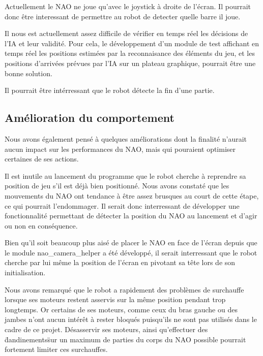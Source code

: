     \par Actuellement le NAO ne joue qu'avec le joystick à droite de l'écran.
    Il pourrait donc être interessant de permettre au robot de detecter quelle barre il joue. \\

    \par Il nous est actuellement assez difficile de vérifier en temps réel les décisions de l'IA et leur validité.
    Pour cela, le développement d'un module de test affichant en temps réel les positions estimées par la reconnaisance des éléments du jeu, et les positions d'arrivées prévues par l'IA sur un plateau graphique, pourrait être une bonne solution.

    \par Il pourrait être intérressant que le robot détecte la fin d'une partie.


  \subsection{Amélioration du comportement}
  \label{sub:Amélioration du comportement}
    \par Nous avons également pensé à quelques améliorations dont la finalité n'aurait aucun impact sur les performances du NAO, mais qui pouraient optimiser certaines de ses actions.\\

    \par Il est inutile au lancement du programme que le robot cherche à reprendre sa position de jeu s'il est déjà bien positionné.
    Nous avons constaté que les mouvements du NAO ont tendance à être assez brusques au court de cette étape, ce qui pourrait l'endommager.
    Il serait donc interressant de développer une fonctionnalité permettant de détecter la position du NAO au lancement et d'agir ou non en conséquence.\\

    \par Bien qu'il soit beaucoup plus aisé de placer le NAO en face de l'écran depuis que le module nao\_camera\_helper a été développé,
    il serait interressant que le robot cherche par lui même la position de l'écran en pivotant sa tête lors de son initialisation.\\

    \par Nous avons remarqué que le robot a rapidement des problèmes de surchauffe lorsque ses moteurs restent asservis sur la même position pendant trop longtemps.
    Or certains de ses moteurs, comme ceux du bras gauche ou des jambes n'ont aucun intérêt à rester bloqués puisqu'ils ne sont pas utilisés dans le cadre de ce projet.
    Désasservir ses moteurs, ainsi qu'effectuer des \"dandinements\" sur un maximum de parties du corps du NAO possible pourrait fortement limiter ces surchauffes.
\pagebreak
